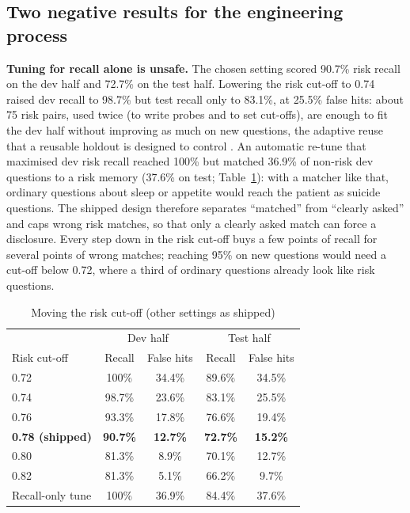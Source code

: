 \documentclass[sn-mathphys-num]{sn-jnl}
\begin{document}
\subsection{Two negative results for the engineering process}
\textbf{Tuning for recall alone is unsafe.} The chosen setting scored 90.7\% risk recall on the dev half and 72.7\% on the test half. Lowering the
risk cut-off to 0.74 raised dev recall to 98.7\% but test recall only to 83.1\%, at 25.5\% false hits: about 75 risk pairs, used twice
(to write probes and to set cut-offs), are enough to fit the dev half without improving as much on new questions, the adaptive reuse that a reusable holdout is designed to
control \cite{dwork2015reusable}. An automatic re-tune that maximised dev risk recall reached 100\%
but matched 36.9\% of non-risk dev questions to a risk memory (37.6\% on test; Table~\ref{tab:sweep}): with a matcher like that, ordinary
questions about sleep or appetite would reach the patient as suicide questions. The shipped design therefore separates ``matched'' from
``clearly asked'' and caps wrong risk matches, so that only a clearly asked match can force a disclosure. Every step down in the risk cut-off buys a few points of
recall for several points of wrong matches; reaching 95\% on new questions would need a cut-off below 0.72, where a third of ordinary questions
already look like risk questions.

\begin{table}[t]
\caption{Moving the risk cut-off (other settings as shipped)}
\label{tab:sweep}
\footnotesize
\begin{tabular*}{\linewidth}{@{\extracolsep{\fill}}lcccc@{}}
\toprule
& \multicolumn{2}{c}{Dev half} & \multicolumn{2}{c}{Test half}\\
Risk cut-off & Recall & False hits & Recall & False hits\\
\midrule
0.72 & 100\% & 34.4\% & 89.6\% & 34.5\%\\
0.74 & 98.7\% & 23.6\% & 83.1\% & 25.5\%\\
0.76 & 93.3\% & 17.8\% & 76.6\% & 19.4\%\\
\textbf{0.78 (shipped)} & \textbf{90.7\%} & \textbf{12.7\%} & \textbf{72.7\%} & \textbf{15.2\%}\\
0.80 & 81.3\% & 8.9\% & 70.1\% & 12.7\%\\
0.82 & 81.3\% & 5.1\% & 66.2\% & 9.7\%\\
\midrule
Recall-only tune & 100\% & 36.9\% & 84.4\% & 37.6\%\\
\bottomrule
\end{tabular*}
\end{table}
\end{document}
